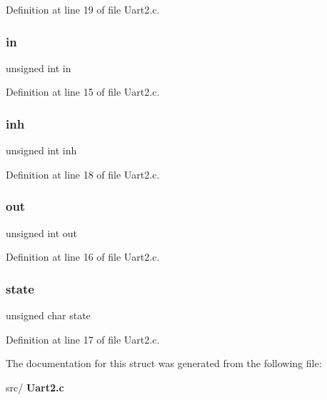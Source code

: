 Definition at line 19 of file Uart2.\+c.

\mbox{\label{structbuf__st_a24285a986380ab7a3cc5fb45e54bf8a9}} 
\subsubsection{in}
{\footnotesize\ttfamily unsigned int in}



Definition at line 15 of file Uart2.\+c.

\mbox{\label{structbuf__st_a0dd46c48f9b435bc2d7418f6d03e7f92}} 
\subsubsection{inh}
{\footnotesize\ttfamily unsigned int inh}



Definition at line 18 of file Uart2.\+c.

\mbox{\label{structbuf__st_ade3d7aac22d9156815ad7df37c7c71a8}} 
\subsubsection{out}
{\footnotesize\ttfamily unsigned int out}



Definition at line 16 of file Uart2.\+c.

\mbox{\label{structbuf__st_ab12828525693568ae9c217805bea1ef9}} 
\subsubsection{state}
{\footnotesize\ttfamily unsigned char state}



Definition at line 17 of file Uart2.\+c.



The documentation for this struct was generated from the following file\+:\begin{DoxyCompactItemize}
\item 
src/\textbf{ Uart2.\+c}\end{DoxyCompactItemize}

